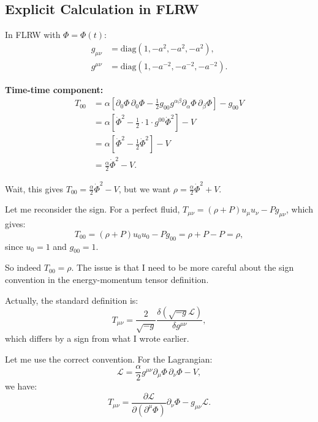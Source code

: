\documentclass[11pt,a4paper]{article}
\numberwithin{equation}{section}
\theoremstyle{plain}
\theoremstyle{definition}
\theoremstyle{remark}
\begin{document}
\subsection{Explicit Calculation in FLRW}

In FLRW with $\Phi = \Phi(t)$:
\begin{align}
g_{\mu\nu} &= \mathrm{diag}(1, -a^2, -a^2, -a^2),\\
g^{\mu\nu} &= \mathrm{diag}(1, -a^{-2}, -a^{-2}, -a^{-2}).
\end{align}

\textbf{Time-time component:}
\begin{align}
T_{00} &= \alpha\left[\partial_0\Phi\,\partial_0\Phi - \frac{1}{2}g_{00}g^{\alpha\beta}\partial_\alpha\Phi\,\partial_\beta\Phi\right] - g_{00}V\\
&= \alpha\left[\dot{\Phi}^2 - \frac{1}{2}\cdot 1\cdot g^{00}\dot{\Phi}^2\right] - V\\
&= \alpha\left[\dot{\Phi}^2 - \frac{1}{2}\dot{\Phi}^2\right] - V\\
&= \frac{\alpha}{2}\dot{\Phi}^2 - V.
\end{align}

Wait, this gives $T_{00} = \frac{\alpha}{2}\dot{\Phi}^2 - V$, but we want $\rho = \frac{\alpha}{2}\dot{\Phi}^2 + V$.

Let me reconsider the sign. For a perfect fluid, $T_{\mu\nu} = (\rho + P)u_\mu u_\nu - Pg_{\mu\nu}$, which gives:
\begin{equation}
T_{00} = (\rho + P)u_0 u_0 - Pg_{00} = \rho + P - P = \rho,
\end{equation}
since $u_0 = 1$ and $g_{00} = 1$.

So indeed $T_{00} = \rho$. The issue is that I need to be more careful about the sign convention in the energy-momentum tensor definition.

Actually, the standard definition is:
\begin{equation}
T_{\mu\nu} = \frac{2}{\sqrt{-g}}\frac{\delta(\sqrt{-g}\mathcal{L})}{\delta g^{\mu\nu}},
\end{equation}
which differs by a sign from what I wrote earlier.

Let me use the correct convention. For the Lagrangian:
\begin{equation}
\mathcal{L} = \frac{\alpha}{2}g^{\mu\nu}\partial_\mu\Phi\,\partial_\nu\Phi - V,
\end{equation}
we have:
\begin{equation}
T_{\mu\nu} = \frac{\partial\mathcal{L}}{\partial(\partial^\mu\Phi)}\partial_\nu\Phi - g_{\mu\nu}\mathcal{L}.
\end{equation}
\end{document}
